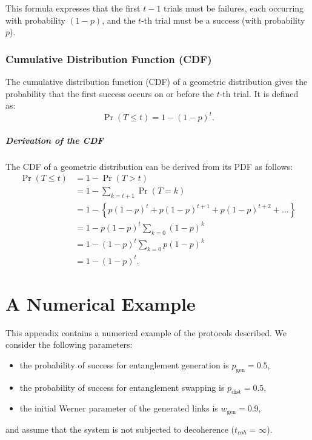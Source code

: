 \documentclass{masterthesis}
\begin{document}
This formula expresses that the first $t-1$ trials must be failures, each occurring with probability $(1-p)$, and the $t$-th trial must be a success (with probability $p$).

\subsection*{Cumulative Distribution Function (CDF)}\label{subsection:geometric_cdf}

The cumulative distribution function (CDF) of a geometric distribution gives the probability that the first success occurs on or before the $t$-th trial. It is defined as:
\begin{equation}
    \Pr(T \leq t) = 1 - (1 - p)^t.
\end{equation}

\paragraph*{Derivation of the CDF}
The CDF of a geometric distribution can be derived from its PDF as follows:
\begin{align*}
    \Pr(T \leq t) &= 1 - \Pr(T > t) \\
    &= 1 - \sum_{k=t+1} \Pr(T = k) \\
    &= 1 - \left\{p (1 - p)^t + p (1 - p)^{t+1} + p (1 - p)^{t+2} + \ldots\right\} \\
    &= 1 - p (1 - p)^t \sum_{k=0} (1 - p)^k \\
    &= 1 - (1 - p)^t \sum_{k=0} p (1 - p)^k \\
    &= 1 - (1 - p)^t.
\end{align*} %

\chapter*{A Numerical Example}

This appendix contains a numerical example of the protocols described. We consider the following parameters:
\begin{itemize}
    \item the probability of success for entanglement generation is $p_{\text{gen}} = 0.5$,
    \item the probability of success for entanglement swapping is $p_{\text{dist}} = 0.5$,
    \item the initial Werner parameter of the generated links is $w_{\text{gen}} = 0.9$,
\end{itemize}
and assume that the system is not subjected to decoherence ($t_{coh} = \infty$).
\end{document}
